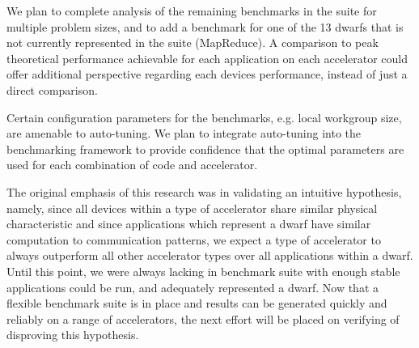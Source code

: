 \documentclass[../document.tex]{subfiles}
\begin{document}
\label{sec:future_work}

We plan to complete analysis of the remaining benchmarks in the suite for multiple problem sizes, and to add a benchmark for one of the 13 dwarfs that is not currently represented in the suite (MapReduce).
A comparison to peak theoretical performance achievable for each application on each accelerator could offer additional perspective regarding each devices performance, instead of just a direct comparison.

Certain configuration parameters for the benchmarks, e.g. local workgroup size, are amenable to auto-tuning.
We plan to integrate auto-tuning into the benchmarking framework to provide confidence that the optimal parameters are used for each combination of code and accelerator.

The original emphasis of this research was in validating an intuitive hypothesis, namely, since all devices within a type of accelerator share similar physical characteristic and since applications which represent a dwarf have similar computation to communication patterns, we expect a type of accelerator to always outperform all other accelerator types over all applications within a dwarf.
Until this point, we were always lacking in benchmark suite with enough stable applications could be run, and adequately represented a dwarf.
Now that a flexible benchmark suite is in place and results can be generated quickly and reliably on a range of accelerators, the next effort will be placed on verifying of disproving this hypothesis.
\end{document}
